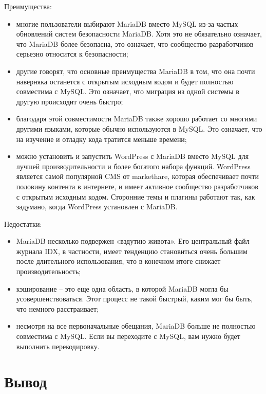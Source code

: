 \hspace{0.6cm} Преимущества:

\begin{itemize}
  \item многие пользователи выбирают MariaDB вместо MySQL из-за частых обновлений систем безопасности MariaDB. Хотя это не обязательно означает, что MariaDB более безопасна, это означает, что сообщество разработчиков серьезно относится к безопасности;
  \item другие говорят, что основные преимущества MariaDB в том, что она почти наверняка останется с открытым исходным кодом и будет полностью совместима с MySQL. Это означает, что миграция из одной системы в другую происходит очень быстро;
  \item благодаря этой совместимости MariaDB также хорошо работает со многими другими языками, которые обычно используются в MySQL. Это означает, что на изучение и отладку кода тратится меньше времени;
  \item можно установить и запустить WordPress с MariaDB вместо MySQL для лучшей производительности и более богатого набора функций. WordPress является самой популярной CMS от markethare, которая обеспечивает почти половину контента в интернете, и имеет активное сообщество разработчиков с открытым исходным кодом. Сторонние темы и плагины работают так, как задумано, когда WordPress установлен с MariaDB.
\end{itemize}

\hspace{0.6cm} Недостатки:

\begin{itemize}
  \item MariaDB несколько подвержен «вздутию живота». Его центральный файл журнала IDX, в частности, имеет тенденцию становиться очень большим после длительного использования, что в конечном итоге снижает производительность;
  \item кэширование – это еще одна область, в которой MariaDB могла бы усовершенствоваться. Этот процесс не такой быстрый, каким мог бы быть, что немного расстраивает;
  \item несмотря на все первоначальные обещания, MariaDB больше не полностью совместима с MySQL. Если вы переходите с MySQL, вам нужно будет выполнить перекодировку.
\end{itemize}

\newpage

\section{Вывод}

